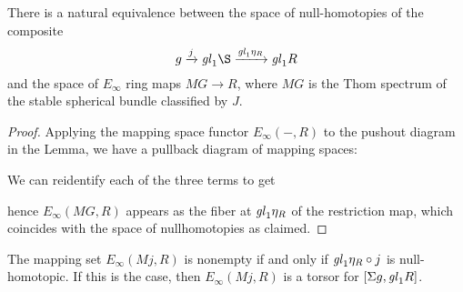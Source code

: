 \begin{corollary}
There is a natural equivalence between the space of null-homotopies of the composite \[g \xrightarrow j \gl_1 \S \xrightarrow{\gl_1 \eta_R} \gl_1 R\] and the space of $E_\infty$ ring maps $MG \to R$, where $MG$ is the Thom spectrum of the stable spherical bundle classified by $J$.
\end{corollary}
\begin{proof}
Applying the mapping space functor $E_\infty(-, R)$ to the pushout diagram in the Lemma, we have a pullback diagram of mapping spaces:
\begin{center}
\end{center}
We can reidentify each of the three terms to get
\begin{center}
\end{center}
hence $E_\infty(MG, R)$ appears as the fiber at $\mathit{gl}_1 \eta_R$ of the restriction map, which coincides with the space of nullhomotopies as claimed.
\end{proof}

\begin{corollary}
The mapping set $E_\infty(Mj, R)$ is nonempty if and only if $\mathit{gl}_1 \eta_R \circ j$ is null-homotopic.  If this is the case, then $E_\infty(Mj, R)$ is a torsor for $[\Sigma g, \mathit{gl}_1 R]$.
\end{corollary}

